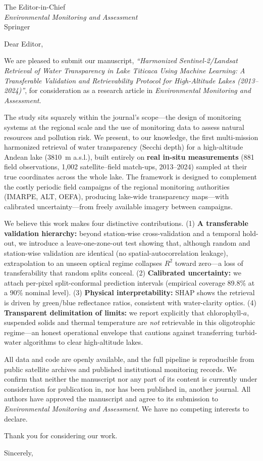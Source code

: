 \documentclass[11pt]{letter}
\begin{document}
\begin{letter}{The Editor-in-Chief\\ \textit{Environmental Monitoring and Assessment}\\ Springer}
\opening{Dear Editor,}

We are pleased to submit our manuscript, \textit{``Harmonized Sentinel-2/Landsat
Retrieval of Water Transparency in Lake Titicaca Using Machine Learning: A
Transferable Validation and Retrievability Protocol for High-Altitude Lakes
(2013--2024)''}, for consideration as a research article in \textit{Environmental
Monitoring and Assessment}.

The study sits squarely within the journal's scope---the design of monitoring
systems at the regional scale and the use of monitoring data to assess natural
resources and pollution risk. We present, to our knowledge, the first multi-mission
harmonized retrieval of water transparency (Secchi depth) for a high-altitude
Andean lake (3810~m a.s.l.), built entirely on \textbf{real in-situ measurements}
(881 field observations, 1{,}002 satellite--field match-ups, 2013--2024) sampled at
their true coordinates across the whole lake. The framework is designed to
complement the costly periodic field campaigns of the regional monitoring
authorities (IMARPE, ALT, OEFA), producing lake-wide transparency maps---with
calibrated uncertainty---from freely available imagery between campaigns.

We believe this work makes four distinctive contributions. (1) \textbf{A
transferable validation hierarchy:} beyond station-wise cross-validation and a
temporal hold-out, we introduce a leave-one-zone-out test showing that, although
random and station-wise validation are identical (no spatial-autocorrelation
leakage), extrapolation to an unseen optical regime collapses $R^2$ toward zero---a
loss of transferability that random splits conceal. (2) \textbf{Calibrated
uncertainty:} we attach per-pixel split-conformal prediction intervals (empirical
coverage 89.8\% at a 90\% nominal level). (3) \textbf{Physical interpretability:}
SHAP shows the retrieval is driven by green/blue reflectance ratios, consistent
with water-clarity optics. (4) \textbf{Transparent delimitation of limits:} we
report explicitly that chlorophyll-$a$, suspended solids and thermal temperature
are \emph{not} retrievable in this oligotrophic regime---an honest operational
envelope that cautions against transferring turbid-water algorithms to clear
high-altitude lakes.

All data and code are openly available, and the full pipeline is reproducible from
public satellite archives and published institutional monitoring records. We
confirm that neither the manuscript nor any part of its content is currently under
consideration for publication in, nor has been published in, another journal. All
authors have approved the manuscript and agree to its submission to
\textit{Environmental Monitoring and Assessment}. We have no competing interests to
declare.

Thank you for considering our work.

\closing{Sincerely,}
\end{letter}
\end{document}
